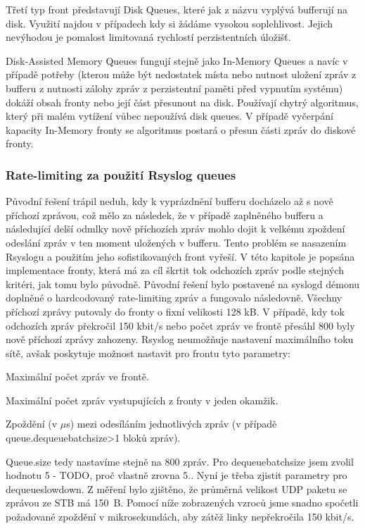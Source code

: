 \documentclass[thesis=B,czech]{FITthesis}[2012/06/26]
\begin{document}
Třetí typ front představují Disk Queues, které jak z názvu vyplývá bufferují na disk. Využití najdou v případech kdy si žádáme vysokou soplehlivost. Jejich nevýhodou je pomalost limitovaná rychlostí perzistentních úložišť.

Disk-Assisted Memory Queues fungují stejně jako In-Memory Queues a navíc v případě potřeby (kterou může být nedostatek místa nebo nutnost uložení zpráv z bufferu z nutnosti zálohy zpráv z perzistentní paměti před vypnutím systému) dokáží obsah fronty nebo její část přesunout na disk. Používají chytrý algoritmus, který při malém vytížení vůbec nepoužívá disk queues. V případě vyčerpání kapacity In-Memory fronty se algoritmus postará o přesun části zpráv do diskové fronty.

\subsubsection*{Rate-limiting za použití Rsyslog queues}
Původní řešení trápil neduh, kdy k vyprázdnění bufferu docházelo až s nově příchozí zprávou, což mělo za následek, že v případě zaplněného bufferu a následující delší odmlky nově příchozích zpráv mohlo dojit k velkému zpoždení odeslání zpráv v ten moment uložených v bufferu. Tento problém se nasazením Rsyslogu a použitím jeho sofistikovaných front vyřeší.
V této kapitole je popsána implementace fronty, která má za cíl škrtit tok odchozích zpráv podle stejných kritéri, jak tomu bylo původně.
Původní řešení bylo postavené na syslogd démonu doplněné o hardcodovaný rate-limiting zpráv a fungovalo následovně. Všechny příchozí zprávy putovaly do fronty o fixní velikosti 128 kB. V případě, kdy tok odchozích zpráv překročil 150 kbit/s nebo počet zpráv ve frontě přesáhl 800 byly nově příchozí zprávy zahozeny.
Rsyslog neumožňuje nastavení maximálního toku sítě, avšak poskytuje možnost nastavit pro frontu tyto parametry:
\begin{description}
  \setlength\itemsep{-1ex}
  \item [queue.size:] Maximální počet zpráv ve frontě.
  \item [queue.dequeuebatchsize:] Maximální počet zpráv vystupujících z fronty v jeden okamžik.
  \item [queue.dequeueslowdown:] Zpoždění (v $\mu$s) mezi odesíláním jednotlivých zpráv (v případě queue.dequeuebatchsize>1 bloků zpráv).
\end{description}
Queue.size tedy nastavíme stejně na 800 zpráv.
Pro dequeuebatchsize jsem zvolil hodnotu 5 - TODO, proč vlastně zrovna 5..
Nyní je třeba zjistit parametry pro dequeueslowdown. Z měření bylo zjištěno, že průměrná velikost UDP paketu se zprávou ze STB má 150~B. Pomocí níže zobrazených vzroců jsme snadno spočetli požadované zpoždění v mikrosekundách, aby zátěž linky nepřekročila 150 kbit/s.
\end{document}
